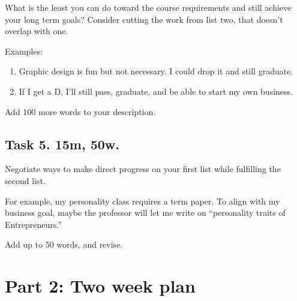 \documentclass[
]{book}
\providecommand{\tightlist}{%
  \setlength{\itemsep}{0pt}\setlength{\parskip}{0pt}}
\begin{document}
What is the least you can do toward the course requirements and still achieve your long term goals?
Consider cutting the work from list two,
that doesn't overlap with one.

Examples:

\begin{enumerate}
\def\labelenumi{\arabic{enumi}.}
\tightlist
\item
  Graphic design is fun but not necessary. I could drop it and
  still graduate.
\item
  If I get a D, I'll still pass, graduate, and be able to start my own
  business.
\end{enumerate}

Add 100 more words to your description.

\subsection{\texorpdfstring{\textbf{Task 5. 15m, 50w.}}{Task 5. 15m, 50w.}}\label{task-5.-15m-50w.}

Negotiate ways to make direct progress on your first list while fulfilling the second list.

For example, my personality class requires a term paper.
To align with my business goal, maybe the professor will let me write
on ``personality traits of Entrepreneurs.''

Add up to 50 words, and revise.

\section{Part 2: Two week plan}\label{part-2-two-week-plan}
\end{document}
